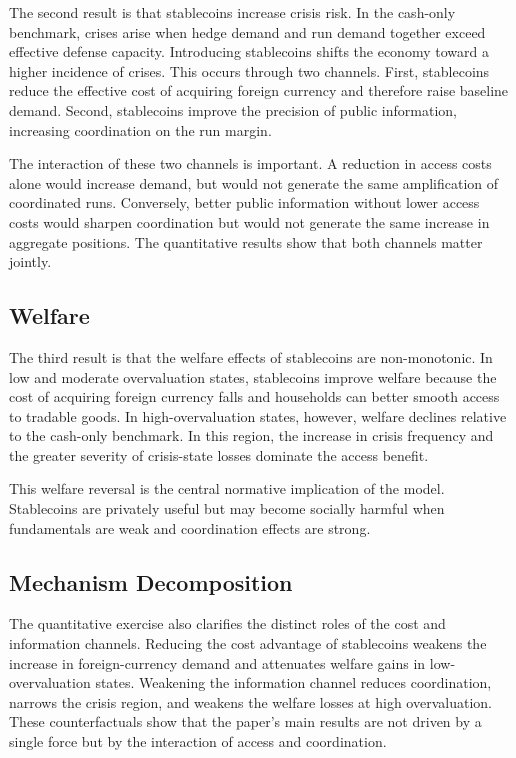 The second result is that stablecoins increase crisis risk. In the cash-only benchmark, crises arise when hedge demand and run demand together exceed effective defense capacity. Introducing stablecoins shifts the economy toward a higher incidence of crises. This occurs through two channels. First, stablecoins reduce the effective cost of acquiring foreign currency and therefore raise baseline demand. Second, stablecoins improve the precision of public information, increasing coordination on the run margin.

The interaction of these two channels is important. A reduction in access costs alone would increase demand, but would not generate the same amplification of coordinated runs. Conversely, better public information without lower access costs would sharpen coordination but would not generate the same increase in aggregate positions. The quantitative results show that both channels matter jointly.

\subsection{Welfare}

The third result is that the welfare effects of stablecoins are non-monotonic. In low and moderate overvaluation states, stablecoins improve welfare because the cost of acquiring foreign currency falls and households can better smooth access to tradable goods. In high-overvaluation states, however, welfare declines relative to the cash-only benchmark. In this region, the increase in crisis frequency and the greater severity of crisis-state losses dominate the access benefit.

This welfare reversal is the central normative implication of the model. Stablecoins are privately useful but may become socially harmful when fundamentals are weak and coordination effects are strong.

\subsection{Mechanism Decomposition}

The quantitative exercise also clarifies the distinct roles of the cost and information channels. Reducing the cost advantage of stablecoins weakens the increase in foreign-currency demand and attenuates welfare gains in low-overvaluation states. Weakening the information channel reduces coordination, narrows the crisis region, and weakens the welfare losses at high overvaluation. These counterfactuals show that the paper's main results are not driven by a single force but by the interaction of access and coordination.

